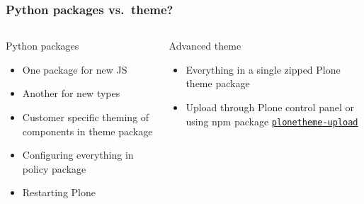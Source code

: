 \documentclass[aspectratio=43]{beamer}
\begin{document}
\begin{frame}[plain,t]
  \frametitle{Python packages vs.\ theme?}
  \begin{columns}[onlytextwidth,t]
  \begin{column}{0.45\textwidth}
  Python packages
  \vspace{1em}
  \begin{itemize}[<+->]
  \setlength{\itemsep}{1em}
  \item One package for new JS
  \item Another for new types
  \item Customer specific theming of components in theme package
  \item Configuring everything in policy package
  \item Restarting Plone
  \end{itemize}
  \end{column}
  \begin{column}{0.45\textwidth}
  Advanced theme
  \vspace{1em}
  \begin{itemize}[<+->]
  \setlength{\itemsep}{1em}
  \item Everything in a single zipped Plone theme package
  \item Upload through Plone control panel or using npm package
  \href{https://www.npmjs.com/package/plonetheme-upload}{\texttt{plonetheme-upload}}
  \end{itemize}
  \end{column}
  \end{columns}
\end{frame}
\end{document}
